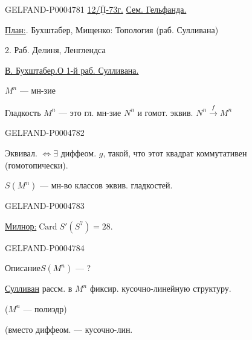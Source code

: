 \begin{GelfandAdjacentEvidence}{GELFAND-P000478}{1}
\uline{12/\mbox{$\overline{\underline{\mathrm{II}}}$}-73г.}
\qquad\uline{Сем. Гельфанда.}

\uline{План:}. Бухштабер, Мищенко: Топология (раб. Сулливана)

\hspace*{3.5em}2. Раб. Делиня, Ленглендса

\uline{В. Бухштабер.}\qquad\uline{О 1-й раб. Сулливана.}

$M^n$ — мн-зие

Гладкость $M^n$ — это гл. мн-зие $N^n$ и гомот. эквив.
$N^n\xrightarrow{f}M^n$
\end{GelfandAdjacentEvidence}
\begin{GelfandAdjacentEvidence}{GELFAND-P000478}{2}

Эквивал. $\Longleftrightarrow\exists$ диффеом. $g$, такой, что этот квадрат коммутативен (гомотопически).

$S(M^n)$ — мн-во классов эквив. гладкостей.

\end{GelfandAdjacentEvidence}
\begin{GelfandAdjacentEvidence}{GELFAND-P000478}{3}

\uline{Милнор:}\quad $\operatorname{Card}S'(S^7)=28$.
\end{GelfandAdjacentEvidence}
\begin{GelfandAdjacentEvidence}{GELFAND-P000478}{4}


Описание\quad $S(M^n)$ — ?

\uline{Сулливан} рассм. в $M^n$ фиксир. кусочно-линейную структуру.
\par\hfill ($M^n$ — полиэдр)


(вместо диффеом. — кусочно-лин.
\end{GelfandAdjacentEvidence}
